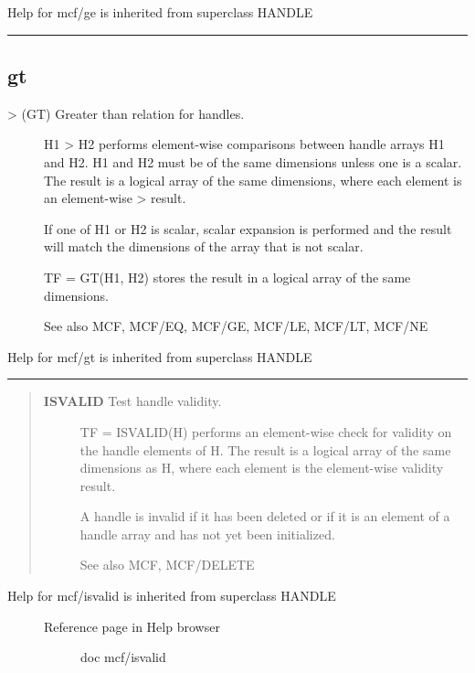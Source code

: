 \documentclass[letterpaper,10pt,english]{sphinxmanual}
\begin{document}
Help for mcf/ge is inherited from superclass HANDLE


\bigskip\hrule{}\bigskip



\subsection{gt}
\label{classes/utils/@mcf/mcf:gt}\label{classes/utils/@mcf/mcf:id3}\begin{description}
\item[{\textgreater{} (GT)   Greater than relation for handles.}] \leavevmode
H1 \textgreater{} H2 performs element-wise comparisons between handle arrays H1 and
H2.  H1 and H2 must be of the same dimensions unless one is a scalar.
The result is a logical array of the same dimensions, where each
element is an element-wise \textgreater{} result.

If one of H1 or H2 is scalar, scalar expansion is performed and the
result will match the dimensions of the array that is not scalar.

TF = GT(H1, H2) stores the result in a logical array of the same
dimensions.

See also MCF, MCF/EQ, MCF/GE, MCF/LE, MCF/LT, MCF/NE

\end{description}

Help for mcf/gt is inherited from superclass HANDLE


\bigskip\hrule{}\bigskip

\label{classes/utils/@mcf/mcf:isvalid}\begin{quote}
\begin{description}
\item[{\textbf{ISVALID}   Test handle validity.}] \leavevmode
TF = ISVALID(H) performs an element-wise check for validity on the
handle elements of H.  The result is a logical array of the same
dimensions as H, where each element is the element-wise validity
result.

A handle is invalid if it has been deleted or if it is an element
of a handle array and has not yet been initialized.

See also MCF, MCF/DELETE

\end{description}
\end{quote}
\begin{description}
\item[{Help for mcf/isvalid is inherited from superclass HANDLE}] \leavevmode\begin{description}
\item[{Reference page in Help browser}] \leavevmode
doc mcf/isvalid

\end{description}

\end{description}
\end{document}

